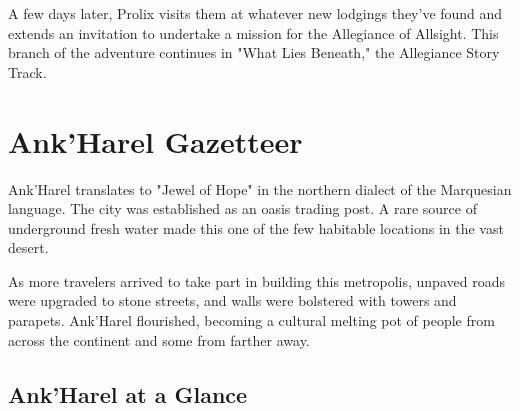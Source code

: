 \documentclass[10pt,a4paper,twoside,twocolumn,openany,nodeprecatedcode]{dndbook}
\begin{document}
A few days later, Prolix visits them at whatever new lodgings they've found and extends an invitation to undertake a mission for the Allegiance of Allsight. This branch of the adventure continues in "What Lies Beneath," the Allegiance Story Track.

\section{Ank'Harel Gazetteer}
Ank'Harel translates to "Jewel of Hope" in the northern dialect of the Marquesian language. The city was established as an oasis trading post. A rare source of underground fresh water made this one of the few habitable locations in the vast desert.

As more travelers arrived to take part in building this metropolis, unpaved roads were upgraded to stone streets, and walls were bolstered with towers and parapets. Ank'Harel flourished, becoming a cultural melting pot of people from across the continent and some from farther away.

\subsection{Ank'Harel at a Glance}
\end{document}
